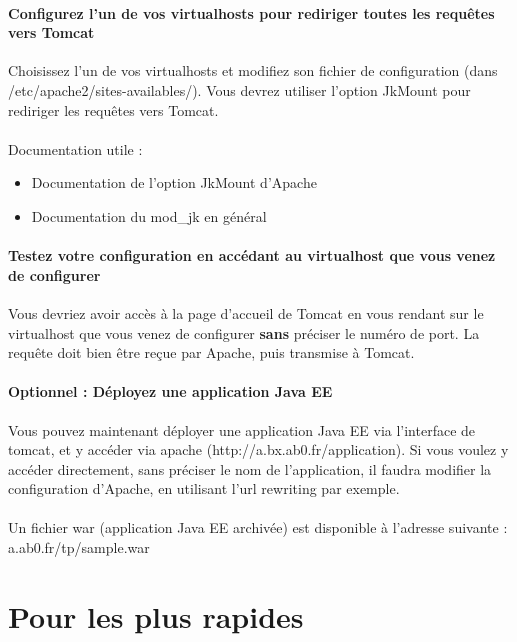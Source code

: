 \documentclass[12pt,a4paper]{article}
\begin{document}
\paragraph{Configurez l'un de vos virtualhosts pour rediriger toutes les requêtes vers Tomcat\\}
Choisissez l'un de vos virtualhosts et modifiez son fichier de configuration (dans /etc/apache2/sites-availables/). Vous devrez utiliser l'option JkMount pour rediriger les requêtes vers Tomcat.

\paragraph{}
Documentation utile : 
\begin{itemize}
\item Documentation de l'option JkMount d'Apache
\item Documentation du mod\_jk en général
\end{itemize}

\paragraph{Testez votre configuration en accédant au virtualhost que vous venez de configurer\\}
Vous devriez avoir accès à la page d'accueil de Tomcat en vous rendant sur le virtualhost que vous venez de configurer \textbf{sans} préciser le numéro de port. La requête doit bien être reçue par Apache, puis transmise à Tomcat.

\paragraph{Optionnel : Déployez une application Java EE\\}
Vous pouvez maintenant déployer une application Java EE via l'interface de tomcat, et y accéder via apache (http://a.bx.ab0.fr/application). Si vous voulez y accéder directement, sans préciser le nom de l'application, il faudra modifier la configuration d'Apache, en utilisant l'url rewriting par exemple.

\paragraph{}
Un fichier war (application Java EE archivée) est disponible à l'adresse suivante : a.ab0.fr/tp/sample.war

\section{Pour les plus rapides}
\end{document}
